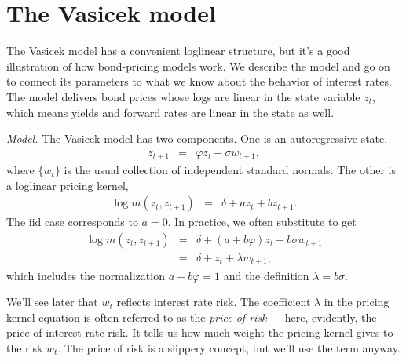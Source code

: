 \documentclass[11pt]{article}
\begin{document}
\section{The Vasicek model}

\begin{comment}
In the previous section, we found bond prices and forward rates
from the pricing kernel.
Here we do that, but we also do the reverse:
We use what we know about forward rates
to estimate the parameters of the pricing kernel.
So what do we know?
We have both time-series and cross-section information.
Time-series information includes the autocorrelations
of interest rates.
Cross-section information includes the mean forward rate curve:
that long rates are on average greater than short rates.
These seem like basic features of interest rates that
we would like any reasonable model to reproduce.
\end{comment}


The Vasicek model has a convenient loglinear structure,
but it's a good illustration of how bond-pricing models work.
We describe the model and go on to connect its
parameters to what we know about the behavior of interest rates.
The model delivers bond prices whose logs are linear in the state variable $z_t$,
which means yields and forward rates are linear in the state as well.


{\it Model.\/}
The Vasicek model has two components.
One is an autoregressive state,
\begin{eqnarray*}
    z_{t+1} &=& \varphi z_t + \sigma w_{t+1} ,
\end{eqnarray*}
where $\{ w_t \}$ is the usual collection of independent
standard normals.
The other is a loglinear pricing kernel,
\begin{eqnarray*}
    \log m(z_t, z_{t+1})  &=& \delta + a z_t + b z_{t+1} .
\end{eqnarray*}
The iid case corresponds to $a = 0$.
%
In practice, we often substitute to get
\begin{eqnarray*}
    \log m(z_t, z_{t+1})  &=& \delta + (a+b\varphi) z_t + b\sigma w_{t+1} \\
        &=& \delta + z_t + \lambda w_{t+1} ,
\end{eqnarray*}
which includes the normalization $a + b \varphi = 1$ and the definition
$\lambda = b \sigma$.


We'll see later that $w_t$ reflects interest rate risk.
The coefficient $\lambda$ in the pricing kernel equation is often referred to as
the {\it price of risk\/} --- here, evidently, the price of interest rate risk.
It tells us how much weight the pricing kernel gives to the risk $w_t$.
The price of risk is a slippery concept, but we'll use the term anyway.
\end{document}
